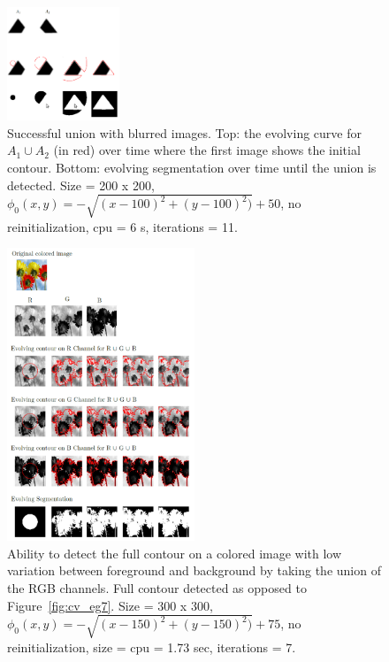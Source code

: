 \documentclass[10pt,twocolumn,letterpaper]{article}
\begin{document}
\begin{figure}[t]
\centering
\includegraphics[width=0.3\textwidth]{sc_blurry.png}
\caption{Successful union with blurred images. Top: the evolving curve for $A_1 \cup A_2$
(in red) over time where the first
image shows the initial
contour. Bottom: evolving segmentation over time until the union is detected. Size = 200 x 200, $\phi_{0}(x,y) = - \sqrt{(x - 100)^2 + (y - 100)^2)} +
50$, no reinitialization, cpu = 6 s, iterations = 11.}
\label{fig:sc_blurry}
\end{figure}

\begin{figure}[t!h!]
\centering
\includegraphics[width=0.5\textwidth]{flowers.png}
\caption{Ability to detect the full contour on a colored image with low variation between foreground and background by taking the union of the RGB channels.
Full contour detected as opposed to Figure~\ref{fig:cv_eg7}. Size = 300 x 300, $\phi_{0}(x,y) = - \sqrt{(x - 150)^2 + (y - 150)^2)} + 75$, no reinitialization,
size = cpu = 1.73 sec, iterations = 7.}
\label{fig:flowers}
\end{figure}
\end{document}

